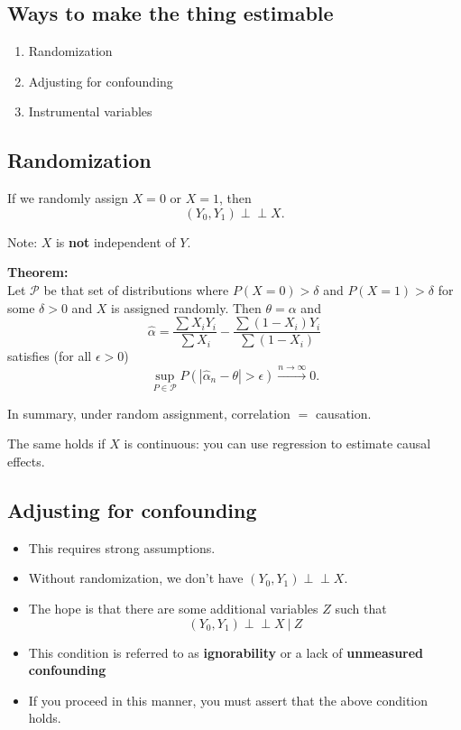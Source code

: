 \documentclass[]{article}
\providecommand{\tightlist}{%
  \setlength{\itemsep}{0pt}\setlength{\parskip}{0pt}}
\begin{document}
\hypertarget{ways-to-make-the-thing-estimable}{%
\subsection{Ways to make the thing
estimable}\label{ways-to-make-the-thing-estimable}}

\begin{enumerate}
\def\labelenumi{\arabic{enumi}.}
\tightlist
\item
  Randomization
\item
  Adjusting for confounding
\item
  Instrumental variables
\end{enumerate}

\hypertarget{randomization}{%
\subsection{Randomization}\label{randomization}}

If we randomly assign \(X=0\) or \(X=1\), then \[
(Y_0,Y_1) \perp\!\!\!\perp X.
\]

Note: \(X\) is \textbf{not} independent of \(Y\).

\textbf{Theorem:}\\
Let \(\mathcal{P}\) be that set of distributions where \(P(X=0)>\delta\)
and \(P(X=1)>\delta\) for some \(\delta>0\) and \(X\) is assigned
randomly. Then \(\theta=\alpha\) and \[
\widehat{\alpha} = \frac{\sum X_iY_i}{\sum X_i} - \frac{\sum (1-X_i)Y_i}{\sum (1-X_i)}
\] satisfies (for all \(\epsilon >0\)) \[
\sup_{P\in\mathcal{P}} P\left(|\widehat{\alpha}_n-\theta|>\epsilon\right) \xrightarrow{n\rightarrow\infty} 0.
\]

In summary, under random assignment, correlation \(=\) causation.

The same holds if \(X\) is continuous: you can use regression to
estimate causal effects.

\hypertarget{adjusting-for-confounding}{%
\subsection{Adjusting for confounding}\label{adjusting-for-confounding}}

\begin{itemize}
\item
  This requires strong assumptions.
\item
  Without randomization, we don't have \((Y_0,Y_1) \perp\!\!\!\perp X\).
\item
  The hope is that there are some additional variables \(Z\) such that
  \[
  (Y_0,Y_1) \perp\!\!\!\perp X \ \vert\ Z
  \]
\item
  This condition is referred to as \textbf{ignorability} or a lack of
  \textbf{unmeasured confounding}
\item
  If you proceed in this manner, you must assert that the above
  condition holds.
\end{itemize}
\end{document}
